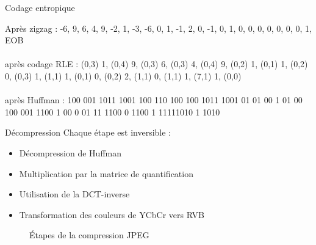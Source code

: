 \documentclass[xcolor=dvipsnames]{beamer}
\begin{document}
\begin{frame} {Codage entropique}
    \scriptsize
    \centering
    
    Après zigzag : -6, 9, 6, 4, 9, -2, 1, -3, -6, 0, 1, -1, 2, 0, -1, 0, 1, 0, 0, 0, 0, 0, 0, 0, 1, EOB \\ \ \\
    après codage RLE : (0,3) 1, (0,4) 9, (0,3) 6, (0,3) 4, (0,4) 9, (0,2) 1, (0,1) 1, (0,2) 0, (0,3) 1, (1,1) 1, (0,1) 0, (0,2) 2, (1,1) 0, (1,1) 1, (7,1) 1, (0,0) \\ \ \\
    après Huffman : 100 001 1011 1001 100 110 100 100 1011 1001 01 01 00 1 01 00 100 001 1100 1 00 0 01 11 1100 0 1100 1 11111010 1 1010

\end{frame}


\begin{frame} {Décompression}
    Chaque étape est inversible :
    \begin{itemize}
        \item Décompression de Huffman
        \item Multiplication par la matrice de quantification
        \item Utilisation de la DCT-inverse
        \item Transformation des couleurs de YCbCr vers RVB
    \end{itemize}

    \begin{figure}
        \centering
        \caption{Étapes de la compression JPEG}
    \end{figure}
\end{frame}
\end{document}
